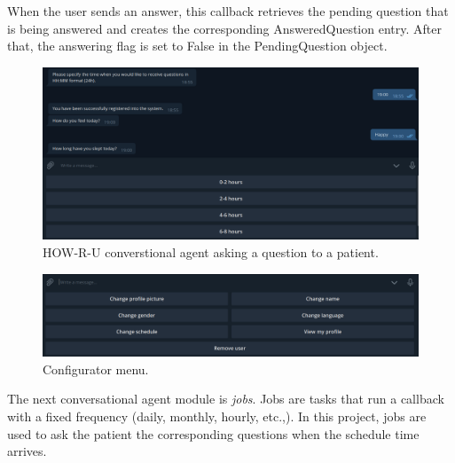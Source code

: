 \documentclass[12pt,english]{article}
\begin{document}
When the user sends an answer, this callback retrieves the pending question that is being answered and creates the corresponding AnsweredQuestion entry. After that, the answering flag is set to False in the PendingQuestion object.

\begin{figure}[H]
  \centering
    \includegraphics[width=\textwidth]{bot_answering.png}
  \caption{HOW-R-U converstional agent asking a question to a patient.}
\end{figure}

\begin{figure}[H]
  \centering
    \includegraphics[width=\textwidth]{config_menu.png}
  \caption{Configurator menu.}
\end{figure}

The next conversational agent module is \emph{jobs}. Jobs are tasks that run a callback with a fixed frequency (daily, monthly, hourly, etc.,). In this project, jobs are used to ask the patient the corresponding questions when the schedule time arrives.
\end{document}
